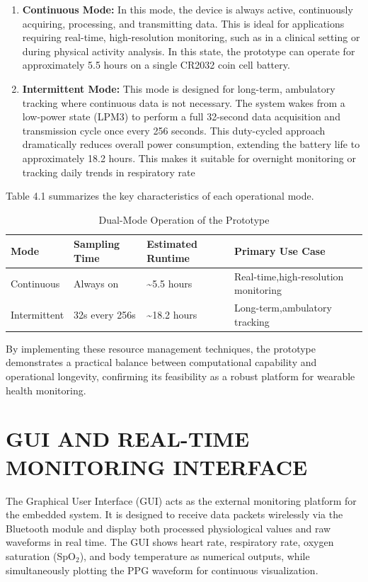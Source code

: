 \documentclass[12pt,a4paper]{report}
\begin{document}
\begin{enumerate}
    \item \textbf{Continuous Mode:} In this mode, the device is always active, continuously acquiring, processing, and transmitting data. This is ideal for applications requiring real-time, high-resolution monitoring, such as in a clinical setting or during physical activity analysis. In this state, the prototype can operate for approximately 5.5 hours on a single CR2032 coin cell battery.
    \item \textbf{Intermittent Mode:} This mode is designed for long-term, ambulatory tracking where continuous data is not necessary. The system wakes from a low-power state (LPM3) to perform a full 32-second data acquisition and transmission cycle once every 256 seconds. This duty-cycled approach dramatically reduces overall power consumption, extending the battery life to approximately 18.2 hours. This makes it suitable for overnight monitoring or tracking daily trends in respiratory rate
\end{enumerate}

Table 4.1 summarizes the key characteristics of each operational mode.
\begin{table}[h!]
\centering
\caption{Dual-Mode Operation of the Prototype}
\label{tab:dual_mode_operation}
\begin{tabular}{|l|l|l|p{5cm}|}
\hline
\textbf{Mode} & \textbf{Sampling Time} & \textbf{Estimated Runtime} & \textbf{Primary Use Case} \\ \hline
Continuous    & Always on              & \textasciitilde{}5.5 hours & Real-time,high-resolution monitoring \\ \hline
Intermittent  & 32s every 256s         & \textasciitilde{}18.2 hours& Long-term,ambulatory tracking      \\ \hline
\end{tabular}
\end{table}

 By implementing these resource management techniques, the prototype demonstrates a practical balance between computational capability and operational longevity, confirming its feasibility as a robust platform for wearable health monitoring.

\section{\large{GUI AND REAL-TIME MONITORING INTERFACE}}

 The Graphical User Interface (GUI) acts as the external monitoring platform for the embedded system. It is designed to receive data packets wirelessly via the Bluetooth module and display both processed physiological values and raw waveforms in real time. The GUI shows heart rate, respiratory rate, oxygen saturation (SpO$_2$), and body temperature as numerical outputs, while simultaneously plotting the PPG waveform for continuous visualization.\\
\end{document}
